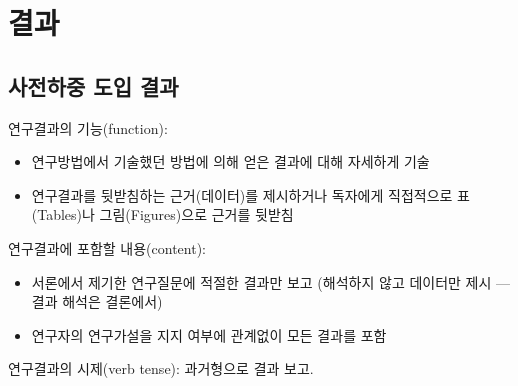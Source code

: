 \chapter{결\quad 과}

\section{사전하중 도입 결과}

연구결과의 기능(function):
\begin{itemize}[leftmargin=3em, itemsep=2pt]
  \item 연구방법에서 기술했던 방법에 의해 얻은 결과에 대해 자세하게 기술
  \item 연구결과를 뒷받침하는 근거(데이터)를 제시하거나 독자에게 직접적으로
        표(Tables)나 그림(Figures)으로 근거를 뒷받침
\end{itemize}

연구결과에 포함할 내용(content):
\begin{itemize}[leftmargin=3em, itemsep=2pt]
  \item 서론에서 제기한 연구질문에 적절한 결과만 보고
        (해석하지 않고 데이터만 제시 --- 결과 해석은 결론에서)
  \item 연구자의 연구가설을 지지 여부에 관계없이 모든 결과를 포함
\end{itemize}

연구결과의 시제(verb tense): 과거형으로 결과 보고.


